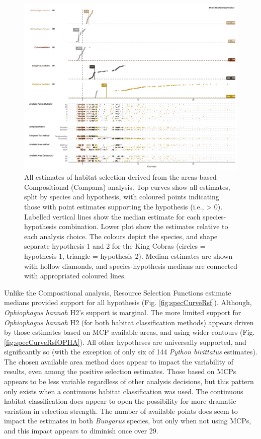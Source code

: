 \documentclass[10pt,a4paper]{article}
\begin{document}
\begin{figure}
\includegraphics[width=1\linewidth]{../../figures/specCurve_area} \caption{All estimates of habitat selection derived from the areas-based Compositional (Compana) analysis. Top curves show all estimates, split by species and hypothesis, with coloured points indicating those with point estimates supporting the hypothesis (i.e., > 0). Labelled vertical lines show the median estimate for each species-hypothesis combination. Lower plot show the estimates relative to each analysis choice. The colours depict the species, and shape separate hypothesis 1 and 2 for the King Cobras (circles = hypothesis 1, triangle = hypothesis 2). Median estimates are shown with hollow diamonds, and species-hypothesis medians are connected with appropriated coloured lines.}\label{fig:specCurveArea}
\end{figure}

Unlike the Compositional analysis, Resource Selection Functions estimate medians provided support for all hypothesis (Fig. \ref{fig:specCurveRsf}).
Although, \emph{Ophiophagus hannah} H2's support is marginal.
The more limited support for \emph{Ophiophagus hannah} H2 (for both habitat classification methods) appears driven by those estimates based on MCP available areas, and using wider contours (Fig. \ref{fig:specCurveRsfOPHA}).
All other hypotheses are universally supported, and significantly so (with the exception of only six of 144 \emph{Python bivittatus} estimates).
The chosen available area method does appear to impact the variability of results, even among the positive selection estimates.
Those based on MCPs appears to be less variable regardless of other analysis decisions, but this pattern only exists when a continuous habitat classification was used.
The continuous habitat classification does appear to open the possibility for more dramatic variation in selection strength.
The number of available points does seem to impact the estimates in both \emph{Bungarus} species, but only when not using MCPs, and this impact appears to diminish once over 29.
\end{document}
